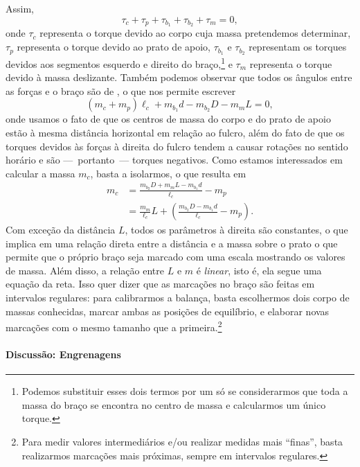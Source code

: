 Assim,
\begin{equation}
    \tau_c + \tau_p + \tau_{b_1} + \tau_{b_2} + \tau_m = 0,
\end{equation}
%
onde $\tau_c$ representa o torque devido ao corpo cuja massa pretendemos determinar, $\tau_p$ representa o torque devido ao prato de apoio, $\tau_{b_1}$ e $\tau_{b_2}$ representam os torques devidos aos segmentos esquerdo e direito do braço,\footnote{Podemos substituir esses dois termos por um só se considerarmos que toda a massa do braço se encontra no centro de massa e calcularmos um único torque.} e $\tau_m$ representa o torque devido à massa deslizante. Também podemos observar que todos os ângulos entre as forças e o braço são de , o que nos permite escrever
\begin{equation}
    (m_c + m_p) \ell_c + m_{b_1} d - m_{b_2} D - m_m L = 0,
\end{equation}
%
onde usamos o fato de que os centros de massa do corpo e do prato de apoio estão à mesma distância horizontal em relação ao fulcro, além do fato de que os torques devidos às forças à direita do fulcro tendem a causar rotações no sentido horário e são ---~portanto~--- torques negativos. Como estamos interessados em calcular a massa $m_c$, basta a isolarmos, o que resulta em
\begin{align}
    m_c &= \frac{m_{b_2} D + m_m L - m_{b_1}d}{\ell_c} - m_p\\
    &= \frac{m_{m}}{\ell_c} L + \left(\frac{m_{b_2} D - m_{b_1}d}{\ell_c} - m_p\right).
\end{align}
%
Com exceção da distância $L$, todos os parâmetros à direita são constantes, o que implica em uma relação direta entre a distância e a massa sobre o prato o que permite que o próprio braço seja marcado com uma escala mostrando os valores de massa. Além disso, a relação entre $L$ e $m$ é \emph{linear}, isto é, ela segue uma equação da reta. Isso quer dizer que as marcações no braço são feitas em intervalos regulares: para calibrarmos a balança, basta escolhermos dois corpo de massas conhecidas, marcar ambas as posições de equilíbrio, e elaborar novas marcações com o mesmo tamanho que a primeira.\footnote[][-2cm]{Para medir valores intermediários e/ou realizar medidas mais ``finas'', basta realizarmos marcações mais próximas, sempre em intervalos regulares.}

\paragraph{Discussão: Engrenagens}

